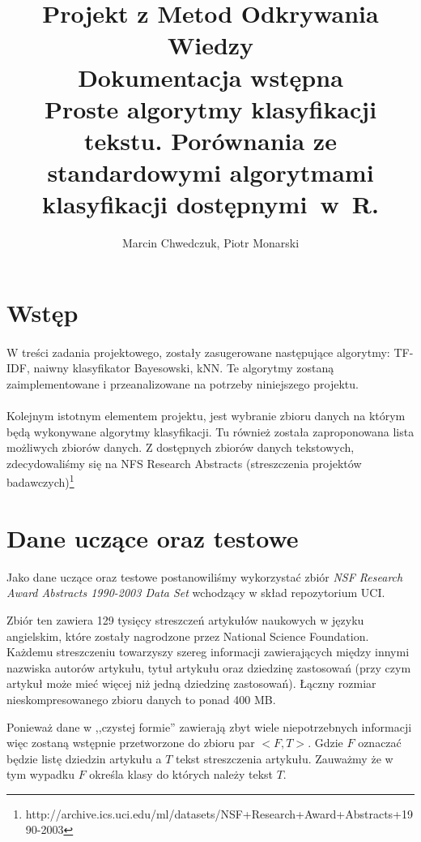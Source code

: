 \documentclass[a4paper,12pt]{article}
\title{Projekt z Metod Odkrywania Wiedzy\\Dokumentacja wstępna\\\Large{Proste algorytmy klasyfikacji tekstu. Porównania ze standardowymi algorytmami klasyfikacji dostępnymi~w~R.}\\}
\author{Marcin Chwedczuk, Piotr Monarski}
\date{}
\begin{document}
\maketitle

\section{Wstęp}
\paragraph{}
W treści zadania projektowego, zostały zasugerowane następujące algorytmy:
TF-IDF, naiwny klasyfikator Bayesowski, kNN. Te algorytmy zostaną
zaimplementowane i przeanalizowane na potrzeby niniejszego projektu.  

\paragraph{}
Kolejnym istotnym elementem projektu, jest wybranie zbioru danych na którym
będą wykonywane algorytmy klasyfikacji. Tu również została zaproponowana
lista możliwych zbiorów danych. Z dostępnych zbiorów danych tekstowych,
zdecydowaliśmy się na NFS Research Abstracts (streszczenia projektów
badawczych)\footnote{http://archive.ics.uci.edu/ml/datasets/NSF+Research+Award+Abstracts+1990-2003}

\section{Dane uczące oraz testowe}

	Jako dane uczące oraz testowe postanowiliśmy wykorzystać
	zbiór \textit{NSF Research Award Abstracts 1990-2003 Data Set}
	wchodzący w skład repozytorium UCI.
	
	Zbiór ten zawiera 129 tysięcy streszczeń artykułów naukowych 
	w języku angielskim,
	które zostały nagrodzone przez National Science Foundation.
	Każdemu streszczeniu towarzyszy szereg informacji zawierających
	między innymi nazwiska autorów artykułu, tytuł artykułu oraz
	dziedzinę zastosowań (przy czym artykuł może mieć więcej 
	niż jedną dziedzinę zastosowań).
	Łączny rozmiar nieskompresowanego zbioru danych to ponad 400 MB.
	
	Ponieważ dane w ,,czystej formie'' zawierają zbyt wiele niepotrzebnych informacji
	więc zostaną wstępnie przetworzone do zbioru 
	par $<F, T>$. Gdzie $F$ oznaczać będzie listę dziedzin artykułu
	a $T$ tekst streszczenia artykułu. Zauważmy że w tym wypadku $F$
	określa klasy do których należy tekst $T$.
	
\end{document}
